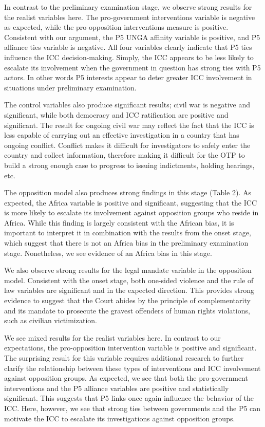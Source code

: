 In contrast to the preliminary examination stage, we observe strong results for the realist variables here.  The pro-government interventions variable is negative as expected, while the pro-opposition interventions measure is positive.  Consistent with our argument, the P5 UNGA affinity variable is positive, and P5 alliance ties variable is negative. All four variables clearly indicate that P5 ties influence the ICC decision-making.  Simply, the ICC appears to be less likely to escalate its involvement when the government in question has strong ties with P5 actors.  In other words P5 interests appear to deter greater ICC involvement in situations under preliminary examination.

The control variables also produce significant results; civil war is negative and significant, while both democracy and ICC ratification are positive and significant. The result for ongoing civil war may reflect the fact that the ICC is less capable of carrying out an effective investigation in a country that has ongoing conflict.  Conflict makes it difficult for investigators to safely enter the country and collect information, therefore making it difficult for the OTP to build a strong enough case to progress to issuing indictments, holding hearings, etc.

The opposition model also produces strong findings in this stage (Table 2). As expected, the Africa variable is positive and significant, suggesting that the ICC is more likely to escalate its involvement against opposition groups who reside in Africa. While this finding is largely consistent with the African bias, it is important to interpret it in combination with the results from the onset stage, which suggest that there is not an Africa bias in the preliminary examination stage.  Nonetheless, we see evidence of an Africa bias in this stage.

We also observe strong results for the legal mandate variable in the opposition model. Consistent with the onset stage, both one-sided violence and the rule of law variables are significant and in the expected direction.  This provides strong evidence to suggest that the Court abides by the principle of complementarity and its mandate to prosecute the gravest offenders of human rights violations, such as civilian victimization.

We see mixed results for the realist variables here. In contrast to our expectations, the pro-opposition intervention variable is positive and significant. The surprising result for this variable requires additional research to further clarify the relationship between these types of interventions and ICC involvement against opposition groups.  As expected, we see that both the pro-government interventions and the P5 alliance variables are positive and statistically significant. This suggests that P5 links once again influence the behavior of the ICC. Here, however, we see that strong ties between governments and the P5 can motivate the ICC to escalate its investigations against opposition groups.

